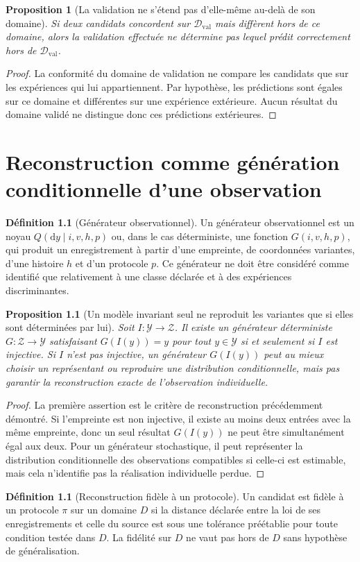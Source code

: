 \documentclass[11pt,oneside]{book}
\newtheorem{proposition}[theoreme]{Proposition}
\theoremstyle{definition}
\newtheorem{definition}[theoreme]{Définition}
\theoremstyle{remark}
\newcommand{\Y}{\mathcal Y}
\newcommand{\Z}{\mathcal Z}
\newcommand{\1}{\mathbf 1}
\newcommand{\dd}{\mathrm d}
\begin{document}
\begin{proposition}[La validation ne s'étend pas d'elle-même au-delà de son domaine]
Si deux candidats concordent sur $\mathcal D_{\mathrm{val}}$ mais diffèrent hors de ce domaine, alors la validation effectuée ne détermine pas lequel prédit correctement hors de $\mathcal D_{\mathrm{val}}$.
\end{proposition}
\begin{proof}
La conformité du domaine de validation ne compare les candidats que sur les expériences qui lui appartiennent. Par hypothèse, les prédictions sont égales sur ce domaine et différentes sur une expérience extérieure. Aucun résultat du domaine validé ne distingue donc ces prédictions extérieures.\end{proof}

\chapter{Reconstruction comme génération conditionnelle d'une observation}
\begin{definition}[Générateur observationnel]
Un générateur observationnel est un noyau \(Q(\dd y\mid i,v,h,p)\) ou, dans le cas déterministe, une fonction \(G(i,v,h,p)\), qui produit un enregistrement à partir d'une empreinte, de coordonnées variantes, d'une histoire \(h\) et d'un protocole \(p\). Ce générateur ne doit être considéré comme identifié que relativement à une classe déclarée et à des expériences discriminantes.
\end{definition}
\begin{proposition}[Un modèle invariant seul ne reproduit les variantes que si elles sont déterminées par lui]
Soit \(I:\Y\to\Z\). Il existe un générateur déterministe \(G:\Z\to\Y\) satisfaisant \(G(I(y))=y\) pour tout \(y\in\Y\) si et seulement si \(I\) est injective. Si \(I\) n'est pas injective, un générateur \(G(I(y))\) peut au mieux choisir un représentant ou reproduire une distribution conditionnelle, mais pas garantir la reconstruction exacte de l'observation individuelle.
\end{proposition}
\begin{proof}
La première assertion est le critère de reconstruction précédemment démontré. Si l'empreinte est non injective, il existe au moins deux entrées avec la même empreinte, donc un seul résultat \(G(I(y))\) ne peut être simultanément égal aux deux. Pour un générateur stochastique, il peut représenter la distribution conditionnelle des observations compatibles si celle-ci est estimable, mais cela n'identifie pas la réalisation individuelle perdue.\end{proof}
\begin{definition}[Reconstruction fidèle à un protocole]
Un candidat est fidèle à un protocole \(\pi\) sur un domaine \(D\) si la distance déclarée entre la loi de ses enregistrements et celle du source est sous une tolérance préétablie pour toute condition testée dans \(D\). La fidélité sur \(D\) ne vaut pas hors de \(D\) sans hypothèse de généralisation.
\end{definition}
\end{document}
